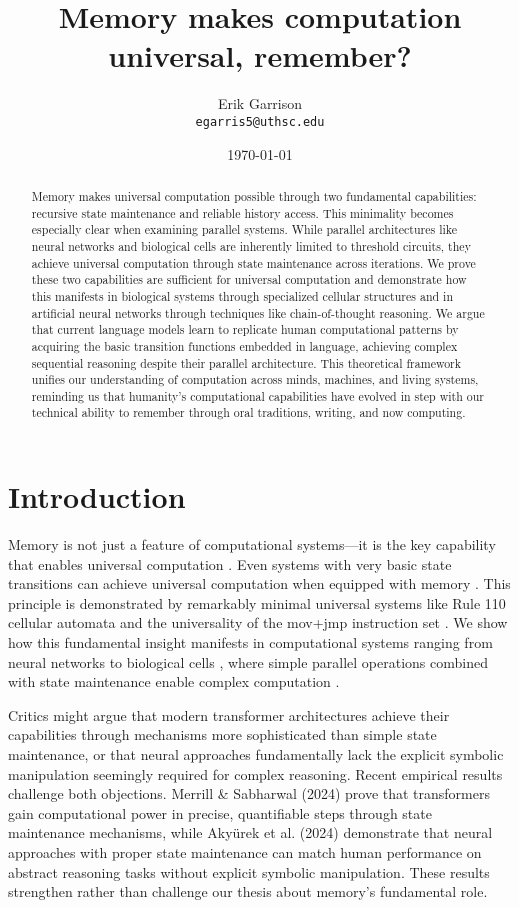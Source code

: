 \documentclass[12pt]{article}
\title{Memory makes computation universal, remember?}
\author{Erik Garrison\\
  \texttt{egarris5@uthsc.edu}\\[1ex]
  }
\date{\today}
\begin{document}
\maketitle

\begin{abstract}
Memory makes universal computation possible through two fundamental capabilities: recursive state maintenance and reliable history access.
This minimality becomes especially clear when examining parallel systems.
While parallel architectures like neural networks and biological cells are inherently limited to threshold circuits, they achieve universal computation through state maintenance across iterations.
We prove these two capabilities are sufficient for universal computation and demonstrate how this manifests in biological systems through specialized cellular structures and in artificial neural networks through techniques like chain-of-thought reasoning.
We argue that current language models learn to replicate human computational patterns by acquiring the basic transition functions embedded in language, achieving complex sequential reasoning despite their parallel architecture.
This theoretical framework unifies our understanding of computation across minds, machines, and living systems, reminding us that humanity's computational capabilities have evolved in step with our technical ability to remember through oral traditions, writing, and now computing.
\end{abstract}

\section{Introduction}
Memory is not just a feature of computational systems—it is the key capability that enables universal computation \cite{turing1936computable}.
Even systems with very basic state transitions can achieve universal computation when equipped with memory \cite{merrill2023parallelism,peng2024limitations}.
This principle is demonstrated by remarkably minimal universal systems like Rule 110 cellular automata \cite{cook2004universality} and the universality of the mov+jmp instruction set \cite{savage1994space}.
We show how this fundamental insight manifests in computational systems ranging from neural networks to biological cells \cite{wang2023parallel}, where simple parallel operations combined with state maintenance enable complex computation \cite{swamy1983space,bisaz2024memory}.

Critics might argue that modern transformer architectures achieve their capabilities through mechanisms more sophisticated than simple state maintenance, or that neural approaches fundamentally lack the explicit symbolic manipulation seemingly required for complex reasoning. Recent empirical results challenge both objections. Merrill \& Sabharwal (2024) prove that transformers gain computational power in precise, quantifiable steps through state maintenance mechanisms, while Akyürek et al. (2024) demonstrate that neural approaches with proper state maintenance can match human performance on abstract reasoning tasks without explicit symbolic manipulation. These results strengthen rather than challenge our thesis about memory's fundamental role.
\end{document}
